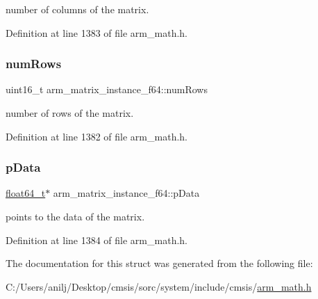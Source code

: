 number of columns of the matrix. 

Definition at line 1383 of file arm\+\_\+math.\+h.

\mbox{\label{structarm__matrix__instance__f64_a8b44d1e5003345047c4ead9e1593bf22}} 
\subsubsection{\texorpdfstring{num\+Rows}{numRows}}
{\footnotesize\ttfamily uint16\+\_\+t arm\+\_\+matrix\+\_\+instance\+\_\+f64\+::num\+Rows}

number of rows of the matrix. 

Definition at line 1382 of file arm\+\_\+math.\+h.

\mbox{\label{structarm__matrix__instance__f64_a5b2475f8ff1e4818955cdd18bc40a097}} 
\subsubsection{\texorpdfstring{p\+Data}{pData}}
{\footnotesize\ttfamily \hyperlink{arm__math_8h_ac55f3ae81b5bc9053760baacf57e47f4}{float64\+\_\+t}$\ast$ arm\+\_\+matrix\+\_\+instance\+\_\+f64\+::p\+Data}

points to the data of the matrix. 

Definition at line 1384 of file arm\+\_\+math.\+h.



The documentation for this struct was generated from the following file\+:\begin{DoxyCompactItemize}
\item 
C\+:/\+Users/anilj/\+Desktop/cmsis/sorc/system/include/cmsis/\hyperlink{arm__math_8h}{arm\+\_\+math.\+h}\end{DoxyCompactItemize}
